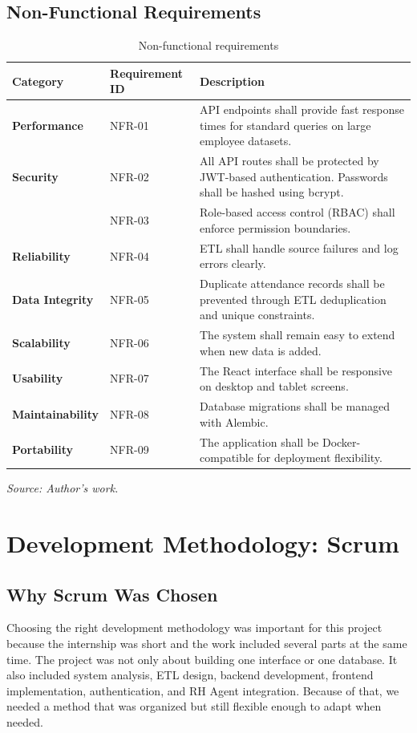 \subsection{Non-Functional Requirements}
\begin{table}[H]
	\centering
	\renewcommand{\arraystretch}{1.25}
	\setlength{\tabcolsep}{6pt}
	\begin{tabular}{|>{\raggedright\arraybackslash}p{3.0cm}|>{\centering\arraybackslash}p{2.2cm}|>{\raggedright\arraybackslash}p{9.0cm}|}
		\hline
		\rowcolor{gray!20}
		\textbf{Category} & \textbf{Requirement ID} & \textbf{Description} \\
		\hline
		\textbf{Performance} & NFR-01 & API endpoints shall provide fast response times for standard queries on large employee datasets. \\
		\hline
		\textbf{Security} & NFR-02 & All API routes shall be protected by JWT-based authentication. Passwords shall be hashed using bcrypt. \\
		\cline{2-3}
		& NFR-03 & Role-based access control (RBAC) shall enforce permission boundaries. \\
		\hline
		\textbf{Reliability} & NFR-04 & ETL shall handle source failures and log errors clearly. \\
		\hline
		\textbf{Data Integrity} & NFR-05 & Duplicate attendance records shall be prevented through ETL deduplication and unique constraints. \\
		\hline
		\textbf{Scalability} & NFR-06 & The system shall remain easy to extend when new data is added. \\
		\hline
		\textbf{Usability} & NFR-07 & The React interface shall be responsive on desktop and tablet screens. \\
		\hline
		\textbf{Maintainability} & NFR-08 & Database migrations shall be managed with Alembic. \\
		\hline
		\textbf{Portability} & NFR-09 & The application shall be Docker-compatible for deployment flexibility. \\
		\hline
	\end{tabular}
	\caption{Non-functional requirements}
	\label{tab:non-functional-requirements}
	{\footnotesize\textit{Source: Author's work.}}
\end{table}

\section{Development Methodology: Scrum}
\subsection{Why Scrum Was Chosen}
Choosing the right development methodology was important for this project because the internship was short and the work included several parts at the same time. The project was not only about building one interface or one database. It also included system analysis, ETL design, backend development, frontend implementation, authentication, and RH Agent integration. Because of that, we needed a method that was organized but still flexible enough to adapt when needed.

